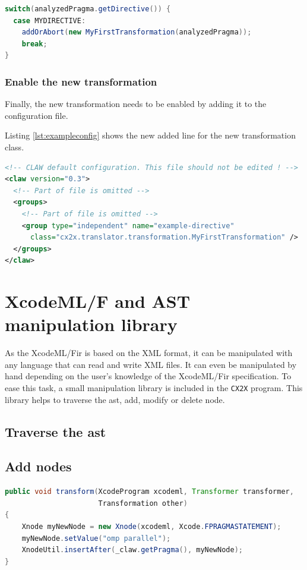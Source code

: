 \documentclass[a4paper, 11pt]{report}
\def\xcodeml{XcodeML/F\xspace}
\def\cx2x{\lstinline!CX2X!\xspace}
\begin{document}
\begin{lstlisting}[label=lst:categorization, caption=ClawXcodeMlTranslator.java, language=java]
switch(analyzedPragma.getDirective()) {
  case MYDIRECTIVE:
    addOrAbort(new MyFirstTransformation(analyzedPragma));
    break;
}
\end{lstlisting}


\subsection{Enable the new transformation}
Finally, the new transformation needs to be enabled by adding it to the 
configuration file. 

Listing \ref{lst:exampleconfig} shows the new added line for the new 
transformation class.

\begin{lstlisting}[label=lst:exampleconfig, caption=claw-default.xml, language=xml]
<!-- CLAW default configuration. This file should not be edited ! -->
<claw version="0.3">
  <!-- Part of file is omitted -->
  <groups>
    <!-- Part of file is omitted -->
    <group type="independent" name="example-directive"
      class="cx2x.translator.transformation.MyFirstTransformation" />
  </groups>
</claw>
\end{lstlisting}



\chapter{\xcodeml and AST manipulation library}
\label{chapter:astmanip}
As the \xcodeml \gls{ir} is based on the XML format, it can be manipulated with
any language that can read and write XML files. It can even be manipulated by 
hand depending on the user's knowledge of the \xcodeml \gls{ir} specification. 
To ease this task, a small manipulation library is included in the \cx2x 
program. This library helps to traverse the \gls{ast}, add, modify or delete 
node.

\section{Traverse the \gls{ast}}

\section{Add nodes}

\begin{lstlisting}[label=lst:add_node, language=Java, caption=XcodeML/F add node example]
public void transform(XcodeProgram xcodeml, Transformer transformer,
                      Transformation other)
{                      
    Xnode myNewNode = new Xnode(xcodeml, Xcode.FPRAGMASTATEMENT);
    myNewNode.setValue("omp parallel");
    XnodeUtil.insertAfter(_claw.getPragma(), myNewNode);
}
\end{lstlisting}
\end{document}
